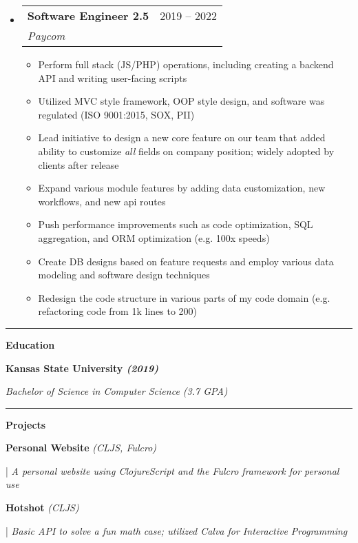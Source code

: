 \documentclass[letterpaper,11pt]{article}
\makeatletter
\newcommand{\resumeItem}[1]{
  \item\small{
    {#1 \vspace{-2pt}}
  }
}
\newcommand{\resumeSubheading}[4]{
  \vspace{-2pt}\item
    \begin{tabular*}{0.97\textwidth}[t]{l@{\extracolsep{\fill}}r}
      \textbf{#1} & #2 \\
      \textit{\small#3} & \textit{\small #4} \\
    \end{tabular*}\vspace{0pt}
}
\newcommand{\resumeSubHeadingListStart}{\begin{itemize}[leftmargin=0.15cm, label={}]}
\newcommand{\resumeSubHeadingListEnd}{\end{itemize}}
\newcommand{\resumeItemListStart}{\begin{itemize}}
\newcommand{\resumeItemListEnd}{\end{itemize}\vspace{-5pt}}
\makeatother
\begin{document}
\resumeSubHeadingListStart
\resumeSubheading
{Software Engineer 2.5}{2019 – 2022}
{Paycom}{}
\resumeItemListStart
\resumeItem{Perform full stack (JS/PHP) operations, including creating a backend API and writing user-facing scripts}
\resumeItem{Utilized MVC style framework, OOP style design, and software was regulated (ISO 9001:2015, SOX, PII)}
\resumeItem{Lead initiative to design a new core feature on our team that added ability to customize \textit{all} fields on company position; widely adopted by clients after release }
\resumeItem{Expand various module features by adding data customization, new workflows, and new api routes}
\resumeItem{Push performance improvements such as code optimization, SQL aggregation, and ORM optimization (e.g. 100x speeds)}
\resumeItem{Create DB designs based on feature requests and employ various data modeling and software design techniques}
\resumeItem{Redesign the code structure in various parts of my code domain (e.g. refactoring code from 1k lines to 200)}
\resumeItemListEnd
\resumeSubHeadingListEnd
\noindent\rule{19.5cm}{0.4pt}

\textbf{\large \textcolor{magic_blue}{Education}}

\begin{minipage}[t]{0.45\textwidth}
    \raggedright
    \textbf{ Kansas State University \textit{(2019)}} \\
\end{minipage}
\hfill
\begin{minipage}[t]{0.45\textwidth}
    \raggedleft
    \textit{Bachelor of Science in Computer Science (3.7 GPA)} \\
\end{minipage}
\noindent\rule{19.5cm}{0.4pt}

\textbf{\large \textcolor{magic_blue}{Projects}}

\begin{minipage}[t]{0.28\textwidth}
    \raggedright
    \textbf{ Personal Website }\textit{(CLJS, Fulcro)} \\
\end{minipage}
\hfill
\begin{minipage}[t]{0.70\textwidth}
    \raggedright
    |\textit{ A personal website using ClojureScript and the Fulcro framework for personal use} \\
\end{minipage}

\begin{minipage}[t]{0.28\textwidth}
    \raggedright
    \textbf{ Hotshot }\textit{(CLJS)}\\
\end{minipage}
\hfill
\begin{minipage}[t]{0.70\textwidth}
    \raggedright
    |\textit{ Basic API to solve a fun math case; utilized Calva for Interactive Programming  } \\
\end{minipage}
\end{document}
